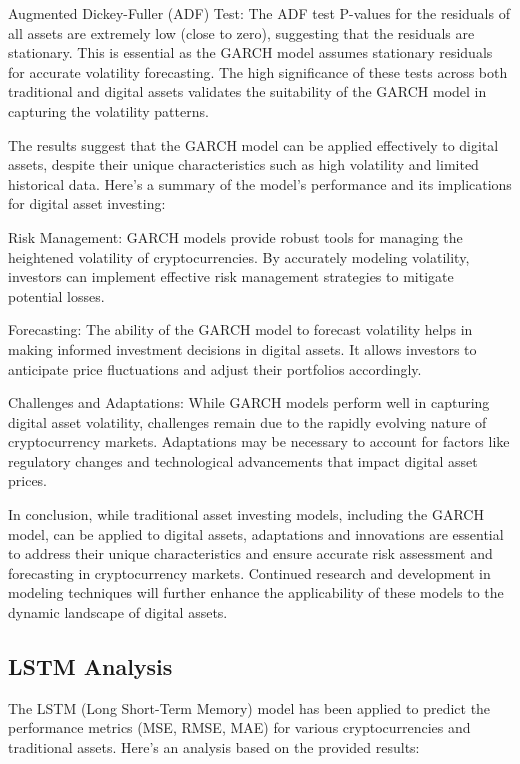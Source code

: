 Augmented Dickey-Fuller (ADF) Test: The ADF test P-values for the residuals of all assets are extremely low (close to zero), suggesting that the residuals are stationary. This is essential as the GARCH model assumes stationary residuals for accurate volatility forecasting. The high significance of these tests across both traditional and digital assets validates the suitability of the GARCH model in capturing the volatility patterns.

The results suggest that the GARCH model can be applied effectively to digital assets, despite their unique characteristics such as high volatility and limited historical data. Here’s a summary of the model’s performance and its implications for digital asset investing:

Risk Management: GARCH models provide robust tools for managing the heightened volatility of cryptocurrencies. By accurately modeling volatility, investors can implement effective risk management strategies to mitigate potential losses.

Forecasting: The ability of the GARCH model to forecast volatility helps in making informed investment decisions in digital assets. It allows investors to anticipate price fluctuations and adjust their portfolios accordingly.

Challenges and Adaptations: While GARCH models perform well in capturing digital asset volatility, challenges remain due to the rapidly evolving nature of cryptocurrency markets. Adaptations may be necessary to account for factors like regulatory changes and technological advancements that impact digital asset prices.

In conclusion, while traditional asset investing models, including the GARCH model, can be applied to digital assets, adaptations and innovations are essential to address their unique characteristics and ensure accurate risk assessment and forecasting in cryptocurrency markets. Continued research and development in modeling techniques will further enhance the applicability of these models to the dynamic landscape of digital assets.

\subsection{LSTM Analysis}

The LSTM (Long Short-Term Memory) model has been applied to predict the performance metrics (MSE, RMSE, MAE) for various cryptocurrencies and traditional assets. Here’s an analysis based on the provided results:

